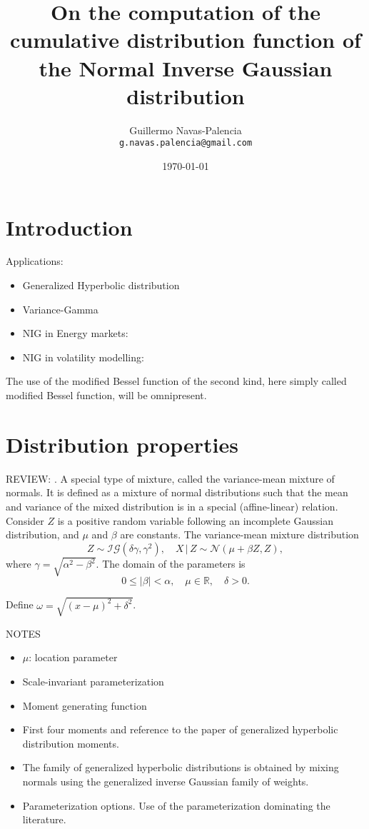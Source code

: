 \documentclass[10pt,a4paper,oneside]{article}
\title{On the computation of the cumulative distribution function of the Normal Inverse Gaussian distribution}
\author{
 \normalsize  Guillermo Navas-Palencia\\
  \texttt{\normalsize  g.navas.palencia@gmail.com}
}
\date{\small \today}
\numberwithin{equation}{section}
\begin{document}
\maketitle

\section{Introduction}

Applications:
\begin{itemize}
\item Generalized Hyperbolic distribution \cite{Prause1999}
\item Variance-Gamma \cite{Madan1990}
\item NIG in Energy markets: \cite{Benth2004}
\item NIG in volatility modelling: \cite{Barndorff1997}
\end{itemize}

The use of the modified Bessel function of the second kind, here simply called modified Bessel function, will be omnipresent.


\section{Distribution properties}

REVIEW: \cite{Paolella2007}. A special type of mixture, called the variance-mean mixture of normals. It is defined as a mixture of normal distributions such that the mean and variance of the mixed distribution is in a special (affine-linear) relation. Consider $Z$ is a positive random variable following an incomplete Gaussian distribution, and $\mu$ and $\beta$ are constants. The variance-mean mixture distribution
\begin{equation}
Z \sim \mathcal{IG}(\delta \gamma, \gamma^2), \quad X \,|\, Z \sim \mathcal{N}(\mu + \beta Z, Z),
\end{equation}
where $\gamma = \sqrt{\alpha^2 - \beta^2}$. The domain of the parameters is
\begin{equation}
0 \le |\beta| < \alpha, \quad \mu \in \mathbb{R}, \quad \delta  > 0.
\end{equation}

Define $\omega = \sqrt{(x-\mu)^2 + \delta^2}$.

NOTES
\begin{itemize}
\item $\mu$: location parameter
\item Scale-invariant parameterization
\item Moment generating function
\item First four moments and reference to the paper of generalized hyperbolic distribution moments.
\item The family of generalized hyperbolic distributions is obtained by mixing normals using the generalized inverse Gaussian family of weights.
\item Parameterization options. Use of the parameterization dominating the literature.
\end{itemize}
\end{document}
